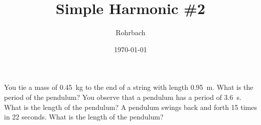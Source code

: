 \documentclass[10pt]{exam}
\title{Simple Harmonic \#2}
\author{Rohrbach}
\date{\today}
\begin{document}
\maketitle

\begin{questions}
  \question You tie a mass of 0.45~kg to the end of a string with length 0.95~m.  What is the period of the pendulum? \vs 
  \question You observe that a pendulum has a period of 3.6~s. What is the length of the pendulum? \vs
  \question A pendulum swings back and forth 15 times in 22 seconds.  What is the length of the pendulum? \vs 
\end{questions}
\end{document}
